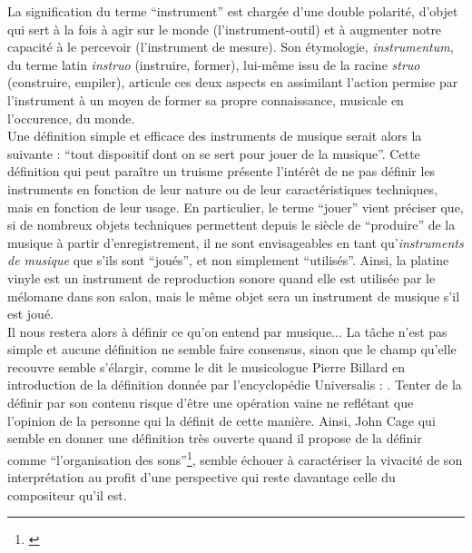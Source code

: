 \noindent La signification du terme ``instrument'' est chargée d'une double polarité, d'objet qui sert à la fois à agir sur le monde (l'instrument-outil) et à augmenter notre capacité à le percevoir (l'instrument de mesure). Son étymologie, \textit{instrumentum}, du terme latin \textit{instruo} (instruire, former), lui-même issu de la racine \textit{struo} (construire, empiler), articule ces deux aspects en assimilant l'action permise par l'instrument à un moyen de former sa propre connaissance, musicale en l'occurence, du monde.\\
\indent Une définition simple et efficace des instruments de musique serait alors la suivante : ``tout dispositif dont on se sert pour jouer de la musique''. Cette définition qui peut paraître un truisme présente l'intérêt de ne pas définir les instruments en fonction de leur nature ou de leur caractéristiques techniques, mais en fonction de leur usage. En particulier, le terme ``jouer'' vient préciser que, si de nombreux objets techniques permettent depuis le siècle de ``produire'' de la musique à partir d'enregistrement, il ne sont envisageables en tant qu'\textit{instruments de musique} que s'ils sont ``joués'', et non simplement ``utilisés''. Ainsi, la platine vinyle est un instrument de reproduction sonore quand elle est utilisée par le mélomane dans son salon, mais le même objet sera un instrument de musique s'il est joué.\\
\indent Il nous restera alors à définir ce qu'on entend par musique... La tâche n'est pas simple et aucune définition ne semble faire consensus, sinon que le champ qu'elle recouvre semble s'élargir, comme le dit le musicologue Pierre Billard en introduction de la définition donnée par l'encyclopédie Universalis : . Tenter de la définir par son contenu risque d'être une opération vaine ne reflétant que l'opinion de la personne qui la définit de cette manière. Ainsi, John Cage qui semble en donner une définition très ouverte quand il propose de la définir comme ``l'organisation des sons''\footnote{ \cite{cage_silence:_1961}}, semble échouer à caractériser la vivacité de son interprétation au profit d'une perspective qui reste davantage celle du compositeur qu'il est.\\
